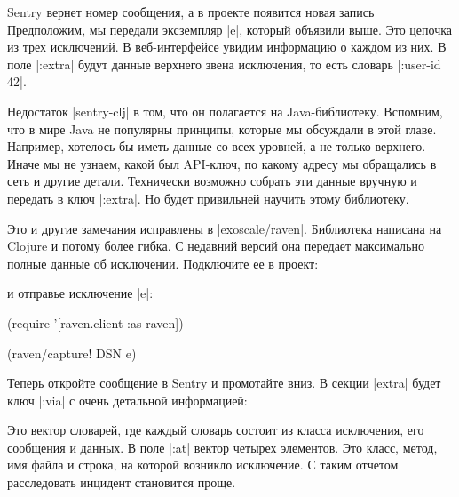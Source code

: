 Sentry вернет номер сообщения, а в проекте появится новая запись Предположим, мы
передали эксземпляр \spverb|e|, который объявили выше. Это цепочка из трех
исключений. В веб-интерфейсе увидим информацию о каждом из них. В поле \spverb|:extra|
будут данные верхнего звена исключения, то есть словарь \spverb|{:user-id 42}|.

Недостаток \spverb|sentry-clj| в том, что он полагается на Java-библиотеку. Вспомним,
что в мире Java не популярны принципы, которые мы обсуждали в этой
главе. Например, хотелось бы иметь данные со всех уровней, а не только
верхнего. Иначе мы не узнаем, какой был API-ключ, по какому адресу мы обращались
в сеть и другие детали. Технически возможно собрать эти данные вручную и
передать в ключ \spverb|:extra|. Но будет привильней научить этому библиотеку.

Это и другие замечания исправлены в \spverb|exoscale/raven|. Библиотека написана на
Clojure и потому более гибка. С недавний версий она передает максимально полные
данные об исключении. Подключите ее в проект:

\begin{code}
\end{code}

и отправье исключение \spverb|e|:

\begin{code}
(require '[raven.client :as raven])

(raven/capture! DSN e)
\end{code}

Теперь откройте сообщение в Sentry и промотайте вниз. В секции \spverb|extra| будет
ключ \spverb|:via| с очень детальной информацией:

\begin{code}
\end{code}

Это вектор словарей, где каждый словарь состоит из класса исключения, его
сообщения и данных. В поле \spverb|:at| вектор четырех элементов. Это класс, метод, имя
файла и строка, на которой возникло исключение. С таким отчетом расследовать
инцидент становится проще.

